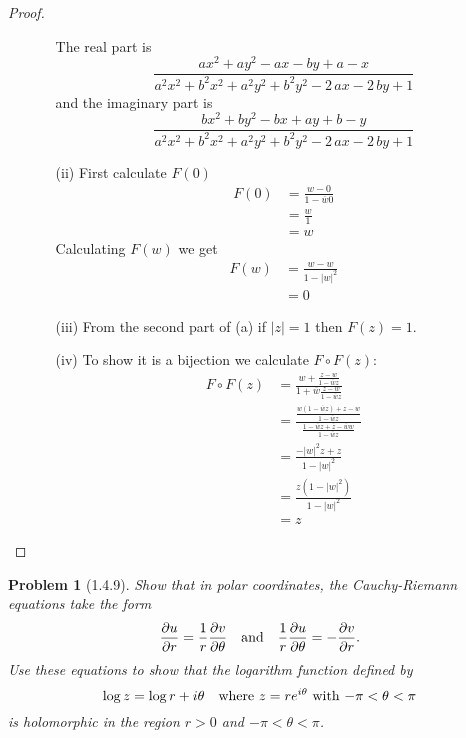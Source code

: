 \documentclass[10pt]{article}
\newcommand{\sk}{\vskip 10mm}
\newcommand{\conj}[1]{\overline{#1}}
\theoremstyle{plain}
\newtheorem{problem}{Problem}
\theoremstyle{remark}
\begin{document}
\begin{proof}
\begin{itemize}
\begin{itemize}
      The real part is
      \[
        \frac{a x^{2}+ay^2-ax-by+a-x}{a^{2} x^{2} + b^{2} x^{2} + a^{2} y^{2} + b^{2} y^{2} - 2 \, a x - 2 \, b y + 1} 
      \]
      and the imaginary part is
      \[
        \frac{bx^2+by^2-bx+ay+b-y}{a^{2} x^{2} + b^{2} x^{2} + a^{2} y^{2} + b^{2} y^{2} - 2 \, a x - 2 \, b y + 1}
      \]
    \item[(ii)] First calculate $F(0)$
      \begin{align*}
        F(0) &= \frac{w-0}{1-\conj{w}0}\\
             &= \frac{w}{1}\\
             &= w
      \end{align*}
      Calculating $F(w)$ we get
      \begin{align*}
        F(w) &= \frac{w-w}{1-|w|^2}\\
             &= 0
      \end{align*}
    \item[(iii)] From the second part of (a) if $|z|=1$ then $F(z)=1$.
    \item[(iv)] To show it is a bijection we calculate $F\circ F(z)$:
      \begin{align*}
        F\circ F(z) &= \frac{w+\frac{z-w}{1-\conj{w}z}}{1+\conj{w}\frac{z-w}{1-\conj{w}z}}\\
                &= \frac{\frac{w(1-\conj{w}z)+z-w}{1-\conj{w}z}}{\frac{1-\conj{w}z+\conj{z}-\conj{w}w}{1-\conj{w}z}}\\
                &= \frac{-|w|^2z+z}{1-|w|^2}\\
                &= \frac{z(1-|w|^2)}{1-|w|^2}\\
                &= z
      \end{align*}
    \end{itemize}
  \end{itemize}
\end{proof}

\sk

\begin{problem}[1.4.9]
  Show that in polar coordinates, the Cauchy-Riemann equations take the form
  \[
    \frac{\partial u}{\partial r}=\frac{1}{r}\frac{\partial v}{\partial\theta} \text{\quad and\quad} \frac{1}{r}\frac{\partial u}{\partial\theta}=-\frac{\partial v}{\partial r}.
  \]
  Use these equations to show that the logarithm function defined by
  \[
    \log z = \log r + i\theta \text{\quad  where $z=re^{i\theta}$ with $-\pi<\theta<\pi$}
  \]
  is holomorphic in the region $r>0$ and $-\pi<\theta<\pi$.
\end{problem}
\end{document}
